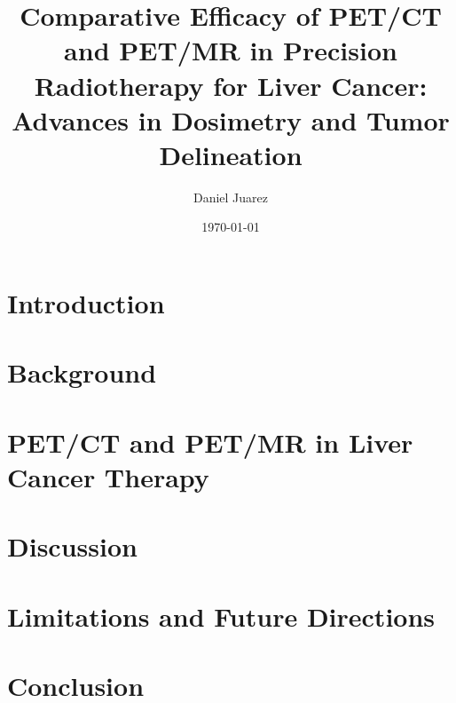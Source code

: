 \documentclass[11pt]{article} %
\title{Comparative Efficacy of PET/CT and PET/MR in Precision Radiotherapy for Liver Cancer: Advances in Dosimetry and Tumor Delineation}
\author{Daniel Juarez}
\date{\today}
\begin{document}
\maketitle

\begin{multicols}{2}


\section{Introduction}


\section{Background}


\end{multicols}

\section{PET/CT and PET/MR in Liver Cancer Therapy}


\begin{multicols}{2}


\section{Discussion}


\section{Limitations and Future Directions}


\section{Conclusion}


\end{multicols}


	




\end{document}
